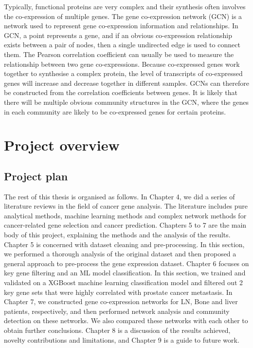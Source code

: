 \documentclass[12pt,a4paper]{report}
\begin{document}
Typically, functional proteins are very complex and their synthesis often involves the co-expression of multiple genes. The gene co-expression network (GCN) \cite{Stu03} is a network used to represent gene co-expression information and relationships. In GCN, a point represents a gene, and if an obvious co-expression relationship exists between a pair of nodes, then a single undirected edge is used to connect them. The Pearson correlation coefficient can usually be used to measure the relationship between two gene co-expressions. Because co-expressed genes work together to synthesise a complex protein, the level of transcripts of co-expressed genes will increase and decrease together in different samples. GCNs can therefore be constructed from the correlation coefficients between genes. It is likely that there will be multiple obvious community structures in the GCN, where the genes in each community are likely to be co-expressed genes for certain proteins. \\

\chapter{Project overview}
\section{Project plan}
The rest of this thesis is organised as follows. In Chapter 4, we did a series of literature reviews in the field of cancer gene analysis. The literature includes pure analytical methods, machine learning methods and complex network methods for cancer-related gene selection and cancer prediction. Chapters 5 to 7 are the main body of this project, explaining the methods and the analysis of the results. Chapter 5 is concerned with dataset cleaning and pre-processing. In this section, we performed a thorough analysis of the original dataset and then proposed a general approach to pre-process the gene expression dataset. Chapter 6 focuses on key gene filtering and an ML model classification. In this section, we trained and validated on a XGBoost machine learning classification model and filtered out 2 key gene sets that were highly correlated with prostate cancer metastasis. In Chapter 7, we constructed gene co-expression networks for LN, Bone and liver patients, respectively, and then performed network analysis and community detection on these networks. We also compared these networks with each other to obtain further conclusions. Chapter 8 is a discussion of the results achieved, novelty contributions and limitations, and Chapter 9 is a guide to future work.\\
\end{document}
